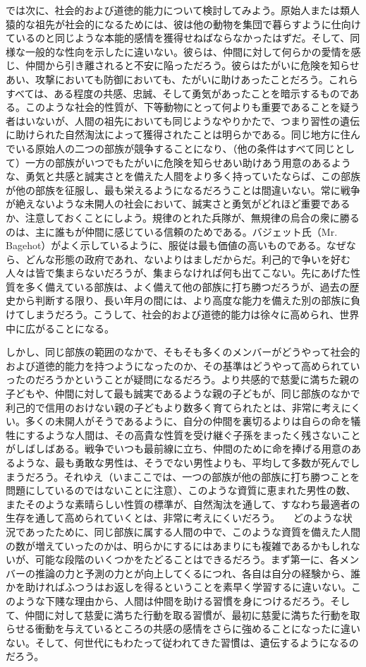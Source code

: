 では次に、社会的および道徳的能力について検討してみよう。原始人または類人猿的な祖先が社会的になるためには、彼は他の動物を集団で暮らすように仕向けているのと同じような本能的感情を獲得せねばならなかったはずだ。そして、同様な一般的な性向を示したに違いない。彼らは、仲間に対して何らかの愛情を感じ、仲間から引き離されると不安に陥っただろう。彼らはたがいに危険を知らせあい、攻撃においても防御においても、たがいに助けあったことだろう。これらすべては、ある程度の共感、忠誠、そして勇気があったことを暗示するものである。このような社会的性質が、下等動物にとって何よりも重要であることを疑う者はいないが、人間の祖先においても同じようなやりかたで、つまり習性の遺伝に助けられた自然淘汰によって獲得されたことは明らかである。同じ地方に住んでいる原始人の二つの部族が競争することになり、（他の条件はすべて同じとして）一方の部族がいつでもたがいに危険を知らせあい助けあう用意のあるような、勇気と共感と誠実さとを備えた人間をより多く持っていたならば、この部族が他の部族を征服し、最も栄えるようになるだろうことは間違いない。常に戦争が絶えないような未開人の社会において、誠実さと勇気がどれほど重要であるか、注意しておくことにしよう。規律のとれた兵隊が、無規律の烏合の衆に勝るのは、主に誰もが仲間に感じている信頼のためである。バジェット氏（Mr. Bagehot）がよく示しているように、服従は最も価値の高いものである。なぜなら、どんな形態の政府であれ、ないよりはましだからだ。利己的で争いを好む人々は皆で集まらないだろうが、集まらなければ何も出てこない。先にあげた性質を多く備えている部族は、よく備えて他の部族に打ち勝つだろうが、過去の歴史から判断する限り、長い年月の間には、より高度な能力を備えた別の部族に負けてしまうだろう。こうして、社会的および道徳的能力は徐々に高められ、世界中に広がることになる。

しかし、同じ部族の範囲のなかで、そもそも多くのメンバーがどうやって社会的および道徳的能力を持つようになったのか、その基準はどうやって高められていったのだろうかということが疑問になるだろう。より共感的で慈愛に満ちた親の子どもや、仲間に対して最も誠実であるような親の子どもが、同じ部族のなかで利己的で信用のおけない親の子どもより数多く育てられたとは、非常に考えにくい。多くの未開人がそうであるように、自分の仲間を裏切るよりは自らの命を犠牲にするような人間は、その高貴な性質を受け継ぐ子孫をまったく残さないことがしばしばある。戦争でいつも最前線に立ち、仲間のために命を捧げる用意のあるような、最も勇敢な男性は、そうでない男性よりも、平均して多数が死んでしまうだろう。それゆえ（いまここでは、一つの部族が他の部族に打ち勝つことを問題にしているのではないことに注意）、このような資質に恵まれた男性の数、またそのような素晴らしい性質の標準が、自然淘汰を通して、すなわち最適者の生存を通して高められていくとは、非常に考えにくいだろう。
　どのような状況であったために、同じ部族に属する人間の中で、このような資質を備えた人間の数が増えていったのかは、明らかにするにはあまりにも複雑であるかもしれないが、可能な段階のいくつかをたどることはできるだろう。まず第一に、各メンバーの推論の力と予測の力とが向上してくるにつれ、各自は自分の経験から、誰かを助ければふつうはお返しを得るということを素早く学習するに違いない。このような下賤な理由から、人間は仲間を助ける習慣を身につけるだろう。そして、仲間に対して慈愛に満ちた行動を取る習慣が、最初に慈愛に満ちた行動を取らせる衝動を与えているところの共感の感情をさらに強めることになったに違いない。そして、何世代にもわたって従われてきた習慣は、遺伝するようになるのだろう。

